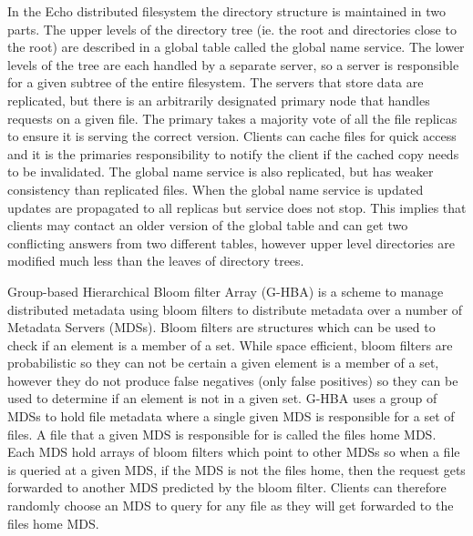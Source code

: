 In the Echo \cite{Hisgen1989} distributed filesystem the directory structure
is maintained in two parts. The upper levels of the directory tree (ie. the
root and directories close to the root) are described in a global table called
the global name service. The lower levels of the tree are each handled by a
separate server, so a server is responsible for a given subtree of the entire
filesystem. The servers that store data are replicated, but there is an
arbitrarily designated primary node that handles requests on a given file. The
primary takes a majority vote of all the file replicas to ensure it is serving
the correct version. Clients can cache files for quick access and it is the
primaries responsibility to notify the client if the cached copy needs to be
invalidated. The global name service is also replicated, but has weaker
consistency than replicated files. When the global name service is updated
updates are propagated to all replicas but service does not stop. This implies
that clients may contact an older version of the global table and can get two
conflicting answers from two different tables, however upper level directories
are modified much less than the leaves of directory trees.


Group-based Hierarchical Bloom filter Array (G-HBA) \cite{Hua2007} is a scheme
to manage distributed metadata using bloom filters to distribute metadata over
a number of Metadata Servers (MDSs). Bloom filters are structures which can be
used to check if an element is a member of a set. While space efficient, bloom
filters are probabilistic so they can not be certain a given element is a
member of a set, however they do not produce false negatives (only false
positives) so they can be used to determine if an element is not in a given
set. G-HBA uses a group of MDSs to hold file metadata where a single given MDS
is responsible for a set of files. A file that a given MDS is responsible for
is called the files home MDS. Each MDS hold arrays of bloom filters which
point to other MDSs so when a file is queried at a given MDS, if the MDS is
not the files home, then the request gets forwarded to another MDS predicted
by the bloom filter. Clients can therefore randomly choose an MDS to query for
any file as they will get forwarded to the files home MDS.


